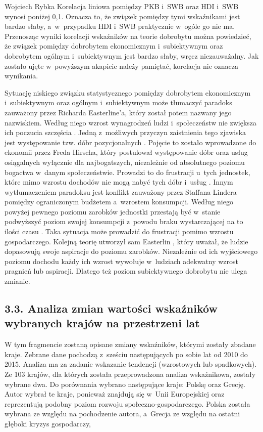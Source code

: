 \begin{artplenv}{Wojciech Rybka}
Korelacja liniowa pomiędzy PKB i~SWB oraz HDI i~SWB wynosi poniżej 0,1. Oznacza to, że związek pomiędzy tymi wskaźnikami
jest bardzo słaby, a~w~przypadku HDI i~SWB praktycznie w~ogóle go nie ma. Przenosząc wyniki korelacji wskaźników na
teorie dobrobytu można powiedzieć, że związek pomiędzy dobrobytem ekonomicznym i~subiektywnym oraz dobrobytem
ogólnym i~subiektywnym jest bardzo słaby, wręcz niezauważalny. Jak zostało ujęte w~powyższym akapicie należy pamiętać,
korelacja nie oznacza wynikania. 

Sytuację niskiego związku statystycznego pomiędzy dobrobytem ekonomicznym  i~subiektywnym oraz ogólnym i~subiektywnym
może tłumaczyć paradoks zauważony przez Richarda Easterline’a, który został potem nazwany jego nazwiskiem. Według niego
wzrost wynagrodzeń ludzi i~społeczeństw nie zwiększa ich poczucia szczęścia
\parencite{czapinski_ekonomia_2012}.
Jedną z~możliwych przyczyn zaistnienia tego zjawiska jest występowanie tzw. dóbr pozycjonalnych
\parencite{ostrowski_czy_2012}.
Pojęcie to zostało wprowadzone do ekonomii przez Freda Hirscha, który
postulował występowanie dóbr oraz usług osiągalnych wyłącznie dla najbogatszych, niezależnie od absolutnego poziomu
bogactwa w~danym społeczeństwie. Prowadzi to do frustracji u~tych jednostek, które mimo wzrostu dochodów nie mogą nabyć
tych dóbr i~usług
\parencite{hirsch_social_2005}.
Innym wytłumaczeniem paradoksu jest konflikt zauważony przez
Staffana Lindera pomiędzy ograniczonym budżetem a~wzrostem konsumpcji. Według niego powyżej pewnego poziomu zarobków
jednostki przestają być w~stanie podwyższyć poziom swojej konsumpcji z~powodu braku wystarczającej na to ilości czasu
\parencite{linder_harried_1970}.
Taka sytuacja może prowadzić do frustracji pomimo wzrostu gospodarczego.
Kolejną teorię utworzył sam Easterlin
\parencite{easterlin_income_2001},
który uważał, że ludzie dopasowują swoje
aspiracje do poziomu zarobków. Niezależnie od ich wyjściowego poziomu dochodu każdy ich wzrost wywołuje w~ludziach
adekwatny wzrost pragnień lub aspiracji. Dlatego też poziom subiektywnego dobrobytu nie ulega zmianie.

\subsection{3.3. Analiza zmian wartości wskaźników wybranych krajów na przestrzeni lat}
W tym fragmencie zostaną opisane zmiany wskaźników, którymi zostały zbadane kraje. Zebrane dane pochodzą z~sześciu
następujących po sobie lat od 2010 do 2015. Analiza ma za zadanie wskazanie tendencji (wzrostowych lub spadkowych). Ze
103 krajów, dla których została przeprowadzona analiza wskaźnikowa, zostały wybrane dwa. Do porównania wybrano
następujące kraje: Polskę oraz Grecję. Autor wybrał te kraje, ponieważ znajdują się w~Unii Europejskiej oraz
reprezentują podobny poziom rozwoju społeczno-gospodarczego. Polska została wybrana ze względu na pochodzenie autora,
a~Grecja ze względu na ostatni głęboki kryzys gospodarczy, 


\end{artplenv}
